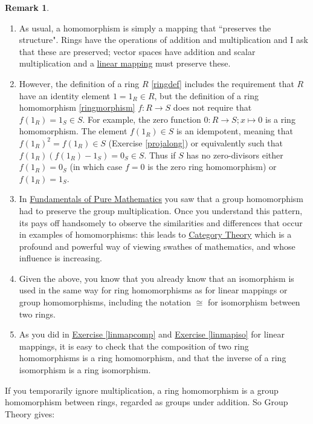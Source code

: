 \documentclass[11pt]{amsbook}
\theoremstyle{definition}
\newtheorem{rem}[theorem]{Remark}
\begin{document}
\begin{rem}
\begin{enumerate}
\item As usual, a homomorphism is simply a mapping that ``preserves the structure". Rings have the operations of addition and multiplication and I ask that these are preserved; vector spaces have addition and scalar multiplication and a \hyperref[deflinmap]{linear mapping} must preserve these.
\item However, the definition of a ring $R$ \ref{ringdef} includes the requirement that $R$ have an identity element $1=1_R \in R$, but the definition of a ring homomorphism \ref{ringmorphism} $f:R \to S$ does not require that $f(1_R)=1_S \in S$.
For example, the zero function $0:R \to S;x \mapsto 0$ is a ring homomorphism.
The element $f(1_R) \in S$ is an idempotent, meaning that $f(1_R)^2=f(1_R) \in S$ (Exercise
\ref{projalong}) or equivalently such that $f(1_R)(f(1_R)-1_S)=0_S \in S$. Thus if $S$ has no zero-divisors either $f(1_R)=0_S$ (in which case $f=0$ is the zero ring homomorphism) or $f(1_R)=1_S$.
\item In \href{http://www.drps.ed.ac.uk/12-13/dpt/cxmath08064.htm}{Fundamentals of Pure Mathematics} you saw that a group homomorphism had to preserve the group multiplication. Once you understand this pattern, its pays off handsomely to  observe the similarities and differences that occur in examples of homomorphisms: this leads to \href{http://en.wikipedia.org/wiki/Category_theory}{Category Theory} which is a profound and powerful way of viewing swathes of mathematics, and whose influence is increasing.
\item Given the above, you know that you already know that an isomorphism is used in the same way for ring homomorphisms as for linear mappings or group homomorphisms, including the notation $\cong$ for isomorphism between two rings.
\item As you did in \hyperref[linmapcomp]{Exercise \ref{linmapcomp}} and \hyperref[linmapiso]{Exercise \ref{linmapiso}} for linear mappings, it is easy to check that the composition of two ring homomorphisms is a ring homomorphism, and that the inverse of a ring isomorphism is a ring isomorphism.
\end{enumerate}
\end{rem}

If you temporarily ignore multiplication, a ring homomorphism is a group homomorphism between rings, regarded as groups under addition. So Group Theory gives:
\end{document}
